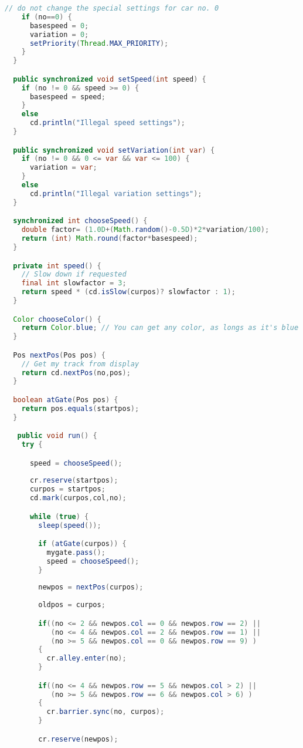 \begin{lstlisting}[language=java]
    // do not change the special settings for car no. 0
    if (no==0) {
      basespeed = 0;  
      variation = 0; 
      setPriority(Thread.MAX_PRIORITY); 
    }
  }

  public synchronized void setSpeed(int speed) { 
    if (no != 0 && speed >= 0) {
      basespeed = speed;
    }
    else
      cd.println("Illegal speed settings");
  }

  public synchronized void setVariation(int var) { 
    if (no != 0 && 0 <= var && var <= 100) {
      variation = var;
    }
    else
      cd.println("Illegal variation settings");
  }

  synchronized int chooseSpeed() { 
    double factor= (1.0D+(Math.random()-0.5D)*2*variation/100);
    return (int) Math.round(factor*basespeed);
  }

  private int speed() {
    // Slow down if requested
    final int slowfactor = 3;  
    return speed * (cd.isSlow(curpos)? slowfactor : 1);
  }

  Color chooseColor() { 
    return Color.blue; // You can get any color, as longs as it's blue 
  }

  Pos nextPos(Pos pos) {
    // Get my track from display
    return cd.nextPos(no,pos);
  }

  boolean atGate(Pos pos) {
    return pos.equals(startpos);
  }

   public void run() {
    try {

      speed = chooseSpeed();
      
      cr.reserve(startpos);
      curpos = startpos;
      cd.mark(curpos,col,no);

      while (true) { 
        sleep(speed());

        if (atGate(curpos)) { 
          mygate.pass(); 
          speed = chooseSpeed();
        }
        	
        newpos = nextPos(curpos);
        
        oldpos = curpos;

        if((no <= 2 && newpos.col == 0 && newpos.row == 2) ||
           (no <= 4 && newpos.col == 2 && newpos.row == 1) ||
           (no >= 5 && newpos.col == 0 && newpos.row == 9) )
        {
          cr.alley.enter(no);
        }

        if((no <= 4 && newpos.row == 5 && newpos.col > 2) ||
           (no >= 5 && newpos.row == 6 && newpos.col > 6) )
        {
          cr.barrier.sync(no, curpos);
        }

        cr.reserve(newpos);


\end{lstlisting}
